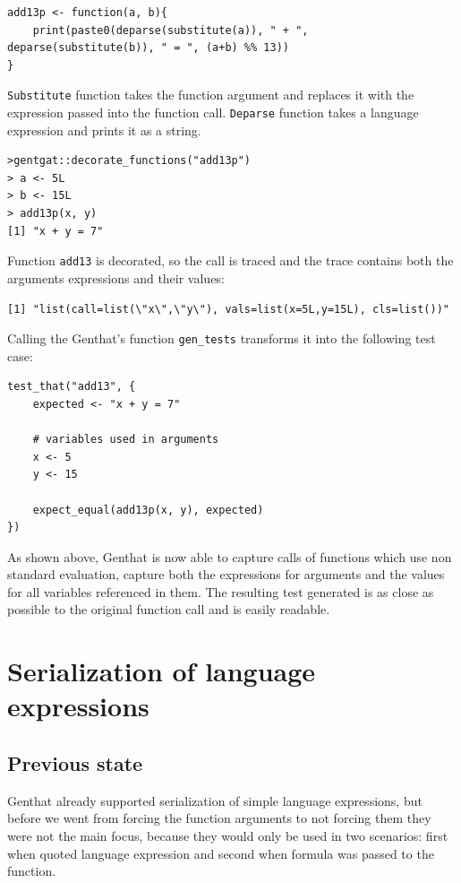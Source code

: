 \documentclass[thesis=B,english]{FITthesis}[2012/10/20]
\begin{document}
\begin{verbatim}
add13p <- function(a, b){
	print(paste0(deparse(substitute(a)), " + ", deparse(substitute(b)), " = ", (a+b) %% 13))
}
\end{verbatim}

\verb|Substitute| function takes the function argument and replaces it with the expression passed into the function call. \verb|Deparse| function takes a language expression and prints it as a string.

\begin{verbatim}
>gentgat::decorate_functions("add13p")
> a <- 5L
> b <- 15L
> add13p(x, y)
[1] "x + y = 7"
\end{verbatim}

Function \verb|add13| is decorated, so the call is traced and the trace contains both the arguments expressions and their values:

\begin{verbatim}
[1] "list(call=list(\"x\",\"y\"), vals=list(x=5L,y=15L), cls=list())"
\end{verbatim}

Calling the Genthat’s function \verb|gen_tests| transforms it into the following test case:

\begin{verbatim}
test_that("add13", {
    expected <- "x + y = 7"

    # variables used in arguments
    x <- 5
    y <- 15

    expect_equal(add13p(x, y), expected)
})
\end{verbatim}

As shown above, Genthat is now able to capture calls of functions which use non standard evaluation, capture both the expressions for arguments and the values for all variables referenced in them.  The resulting test generated is as close as possible to the original function call and is easily readable. 

\chapter{Serialization of language expressions} \label{chap:expr}
\section{Previous state}
Genthat already supported serialization of simple language expressions, but before we went from forcing the function arguments to not forcing them they were not the main focus, because they would only be used in two scenarios:  first when quoted language expression and second when formula was passed to the function. 
\end{document}
